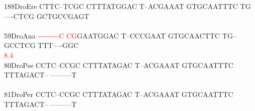 \documentclass[11pt,twoside,reqno,a4paper]{article}
\begin{document}
{188\hspace*{1\charwidth}DroEre	CTTC--TCGC	CTTTATGGAC	T--ACGAAAT	GTGCAATTTC	TG----CTCG	GCTGCCGAGT	\\
\hspace*{4\charwidth}\hspace*{7\charwidth}\hspace*{1\charwidth}\hspace*{1\charwidth}\hspace*{1\charwidth}\hspace*{1\charwidth}\hspace*{1\charwidth}\hspace*{1\charwidth}\\
59\hspace*{2\charwidth}DroAna	\textcolor{Red}{-}\textcolor{Red}{-}\textcolor{Red}{-}\textcolor{Red}{-}\textcolor{Red}{-}\textcolor{Red}{-}\textcolor{Red}{-}\textcolor{Red}{-}\textcolor{Red}{-}\textcolor{Red}{C}	\textcolor{Red}{C}\textcolor{Red}{G}GAATGGAC	T--CCCGAAT	GTGCAACTTC	TG--GCCTCG	TTT----GGC	\\
\hspace*{4\charwidth}\hspace*{7\charwidth}\hspace*{0\charwidth}\textcolor{Red}{8.4}\hspace*{1\charwidth}\hspace*{1\charwidth}\hspace*{1\charwidth}\hspace*{1\charwidth}\hspace*{1\charwidth}\hspace*{1\charwidth}\\
80\hspace*{2\charwidth}DroPse	CCTC--CCGC	CTTTATAGAC	T--ACGAAAT	GTGCAATTTC	TTTAGACT--	---------T	\\
\hspace*{4\charwidth}\hspace*{7\charwidth}\hspace*{1\charwidth}\hspace*{1\charwidth}\hspace*{1\charwidth}\hspace*{1\charwidth}\hspace*{1\charwidth}\hspace*{1\charwidth}\\
81\hspace*{2\charwidth}DroPer	CCTC--CCGC	CTTTATAGAC	T--ACGAAAT	GTGCAATTTC	TTTAGACT--	---------T	\\
\hspace*{4\charwidth}\hspace*{7\charwidth}\hspace*{1\charwidth}\hspace*{1\charwidth}\hspace*{1\charwidth}\hspace*{1\charwidth}\hspace*{1\charwidth}\hspace*{1\charwidth}\\
}
\end{document}
